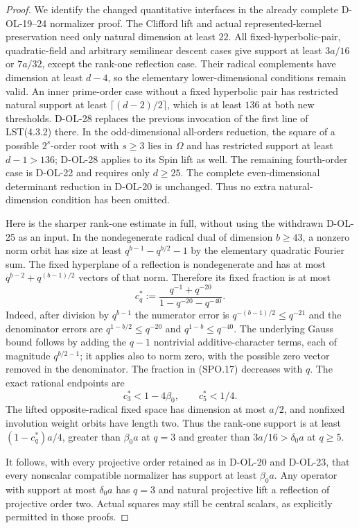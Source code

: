 \begin{proof}
We identify the changed quantitative interfaces in the
already complete D-OL-19--24 normalizer proof.
The Clifford lift and actual represented-kernel preservation
need only natural dimension at least $22$.
All fixed-hyperbolic-pair, quadratic-field and arbitrary
semilinear descent cases give support at least $3a/16$ or
$7a/32$, except the rank-one reflection case.
Their radical complements have dimension at least $d-4$,
so the elementary lower-dimensional conditions remain valid.
An inner prime-order case without a fixed hyperbolic pair
has restricted natural support at least
$\lceil(d-2)/2\rceil$, which is at least $136$ at both
new thresholds.  D-OL-28 replaces the previous invocation
of the first line of LST(4.3.2) there.
In the odd-dimensional all-orders reduction, the square of
a possible $2^s$-order root with $s\ge3$ lies in $\Omega$
and has restricted support at least $d-1>136$;
D-OL-28 applies to its Spin lift as well.
The remaining fourth-order case is D-OL-22 and requires
only $d\ge25$.
The complete even-dimensional determinant reduction in
D-OL-20 is unchanged.  Thus no extra natural-dimension
condition has been omitted.

Here is the sharper rank-one estimate in full, without
using the withdrawn D-OL-25 as an input.
In the nondegenerate radical dual of dimension $b\ge43$,
a nonzero norm orbit has size at least
$q^{b-1}-q^{b/2}-1$ by the elementary quadratic Fourier
sum.  The fixed hyperplane of a reflection is nondegenerate
and has at most $q^{b-2}+q^{(b-1)/2}$ vectors of that norm.
Therefore its fixed fraction is at most
\[
 c_q^*:=\frac{q^{-1}+q^{-20}}{1-q^{-20}-q^{-40}}.
 \tag{SPO.17}
\]
Indeed, after division by $q^{b-1}$ the numerator error
is $q^{-(b-1)/2}\le q^{-21}$ and the denominator errors
are $q^{1-b/2}\le q^{-20}$ and $q^{1-b}\le q^{-40}$.
The underlying Gauss bound follows by adding the $q-1$
nontrivial additive-character terms, each of magnitude
$q^{b/2-1}$; it applies also to norm zero, with the
possible zero vector removed in the denominator.
The fraction in (SPO.17) decreases with $q$.
The exact rational endpoints are
\[
           c_3^*<1-4\beta_0,\qquad c_5^*<1/4.
 \tag{SPO.18}
\]
The lifted opposite-radical fixed space has dimension
at most $a/2$, and nonfixed involution weight orbits
have length two.  Thus the rank-one support is at least
$(1-c_q^*)a/4$, greater than $\beta_0a$ at $q=3$ and
greater than $3a/16>\delta_0a$ at $q\ge5$.

It follows, with every projective order retained as in
D-OL-20 and D-OL-23, that every nonscalar compatible
normalizer has support at least $\beta_0a$.
Any operator with support at most $\delta_0a$ has
$q=3$ and natural projective lift a reflection of
projective order two.  Actual squares may still be
central scalars, as explicitly permitted in those proofs.


\end{proof}

